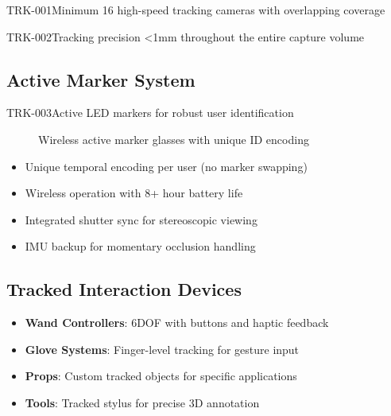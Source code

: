 \begin{requirement}{TRK-001}{Minimum 16 high-speed tracking cameras with overlapping coverage}
\begin{requirement}{TRK-002}{Tracking precision <1mm throughout the entire capture volume}
\subsection{Active Marker System}

\begin{requirement}{TRK-003}{Active LED markers for robust user identification}

\begin{figure}[H]
\centering
{}
\caption{Wireless active marker glasses with unique ID encoding}
\end{figure}

\begin{itemize}
    \item Unique temporal encoding per user (no marker swapping)
    \item Wireless operation with 8+ hour battery life
    \item Integrated shutter sync for stereoscopic viewing
    \item IMU backup for momentary occlusion handling
\end{itemize}

\subsection{Tracked Interaction Devices}

\begin{itemize}
    \item \textbf{Wand Controllers}: 6DOF with buttons and haptic feedback
    \item \textbf{Glove Systems}: Finger-level tracking for gesture input
    \item \textbf{Props}: Custom tracked objects for specific applications
    \item \textbf{Tools}: Tracked stylus for precise 3D annotation
\end{itemize}


\end{requirement}
\end{requirement}
\end{requirement}
